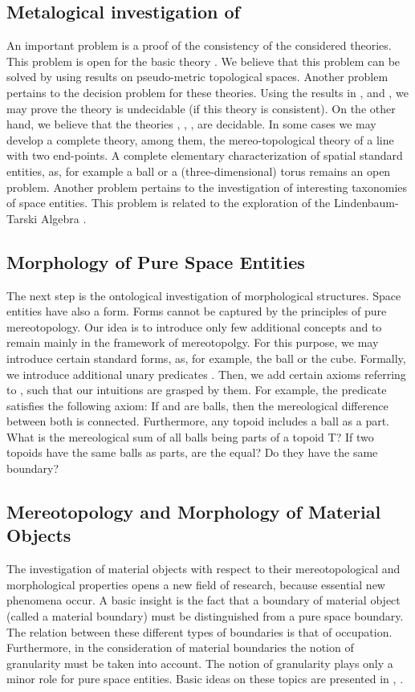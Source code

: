 \documentclass{ao2e}
\begin{document}
{\subsection{Metalogical investigation of }
An important problem is a proof of the consistency of the considered theories. This problem is open
for  the basic theory . We believe that this problem can be solved by using results on pseudo-metric topological spaces. Another problem pertains to the decision problem for these theories.
Using the results in \cite{herre-h-1973-a},
and \cite{hanf-w-1965-a}, we may prove the theory  is undecidable (if this theory is consistent).
On the other hand, we believe that the theories , , , are decidable.
In some cases we may develop a complete theory, among them, the mereo-topological theory of a line with two
end-points. A complete elementary characterization of spatial standard entities, as, for example a ball or a (three-dimensional) torus remains an open problem. Another problem pertains to the investigation of interesting taxonomies of space entities. This problem is related to the exploration of the Lindenbaum-Tarski Algebra
.\\

\subsection{Morphology of Pure Space Entities}
The next step is the ontological investigation of 
morphological structures. Space entities have also a form. Forms cannot be captured by the principles of pure mereotopology. Our idea is to introduce only few additional concepts
and to remain mainly in the framework of mereotopolgy. For this purpose, we may introduce certain standard forms,
as, for example, the ball or the cube. Formally, we introduce additional unary predicates
. Then, we add certain axioms referring to ,  such that our intuitions
are grasped by them. For example, the predicate  satisfies the following axiom:
If  and  are balls, then the mereological difference between both is connected.
Furthermore, any topoid includes a ball as a part. What is the mereological sum
of all balls being parts of a topoid T?  If two topoids have the same balls as parts, are the equal?
Do they have the same boundary?\\

\subsection{Mereotopology and Morphology of Material Objects}
The investigation of material objects with respect to their mereotopological and morphological 
properties opens a new field of research, because essential new phenomena occur. A basic insight is the fact
that a boundary of material object (called a material boundary) must be distinguished from a pure
space boundary. The relation between these different types of boundaries is that of occupation. Furthermore, in
the consideration of material boundaries the notion of granularity must be taken into account. The notion of
granularity plays only a minor role for pure space entities. Basic ideas on these topics are presented
in \cite{baumann-r-2009-a}, \cite{herre-h-2010-a}.\\

}
\end{document}
